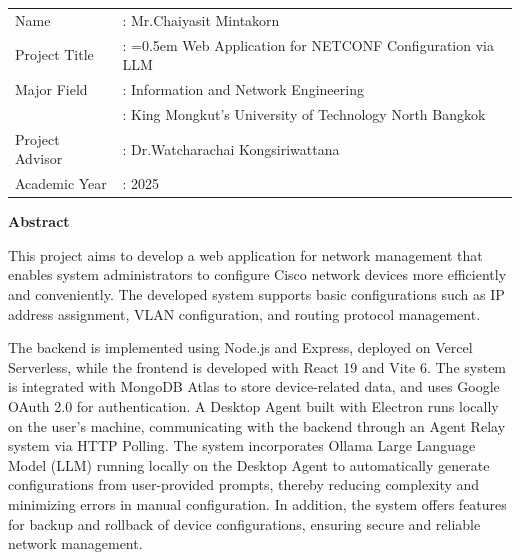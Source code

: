 \begin{tabularx}{\textwidth}{lX}
Name                    & : Mr.Chaiyasit Mintakorn  %
\\
Project Title           & : \hangindent=0.5em %
                            Web Application for NETCONF Configuration via LLM  %
\\
Major Field             & : Information and Network Engineering %
\\
                        & : King Mongkut’s University of Technology North Bangkok
\\
Project Advisor         & : Dr.Watcharachai Kongsiriwattana   %
\\
Academic Year           & : 2025    %
\end{tabularx}

\vspace{5mm}
\begin{center}\textbf{Abstract}\end{center}

\hspace*{1.3em} %
 This project aims to develop a web application for network management that
 enables system administrators to configure Cisco network devices more efficiently and
 conveniently. The developed system supports basic configurations such as IP address
 assignment, VLAN configuration, and routing protocol management.
 
 \hspace*{1.3em} %
 The backend is implemented using Node.js and Express, deployed on Vercel
 Serverless, while the frontend is developed with React 19 and Vite 6. The system is
 integrated with MongoDB Atlas to store device-related data, and uses Google OAuth 2.0
 for authentication. A Desktop Agent built with Electron runs locally on the user's
 machine, communicating with the backend through an Agent Relay system via HTTP
 Polling. The system incorporates Ollama Large Language Model (LLM) running locally
 on the Desktop Agent to automatically generate configurations from user-provided
 prompts, thereby reducing complexity and minimizing errors in manual configuration.
 In addition, the system offers features for backup and
 rollback of device configurations, ensuring secure and reliable network management.

